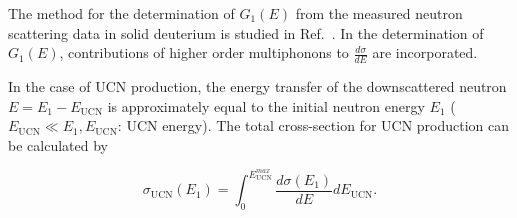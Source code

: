 The method for the determination of $G_1(E)$ from the measured neutron
scattering data in solid deuterium is studied in
Ref.~\cite{Frei2009}. In the determination of $G_1(E)$, contributions
of higher order multiphonons to $\frac{d\sigma}{dE}$ are incorporated.

In the case of UCN production, the energy transfer of the
downscattered neutron $E=E_1-E_{\text{UCN}}$ is approximately equal to
the initial neutron energy $E_1$
($E_{\text{UCN}} \ll E_1, E_{\text{UCN}}$: UCN energy). The total
cross-section for UCN production can be calculated by

\begin{equation}
\sigma_{\text{UCN}}({E_1})=\int_0 ^{E_{\text{UCN}}^{max}} \frac{d\sigma (E_1)}{dE} dE_{\text{UCN}}.
\end{equation}

